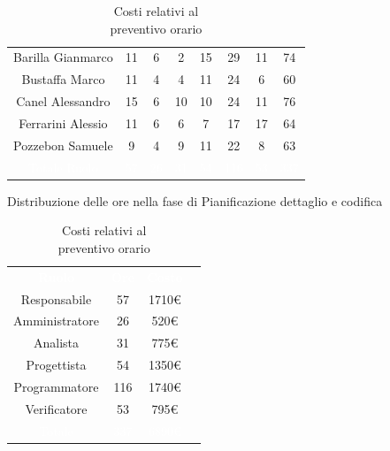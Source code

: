 \begin{table}[h!]
\begin{minipage}[c]{0.53\textwidth}
\begin{tabular}{>{\raggedright\arraybackslash}c|cccccc|c}
		\rowcolor[RGB]{216, 235, 171}
	    	Barilla Gianmarco & 11 & 6 & 2 & 15 & 29 & 11 & 74		\\[9pt]
	    \rowcolor[RGB]{216, 235, 171}
	    	Bustaffa Marco & 11 & 4 & 4 & 11 & 24 & 6 & 60			\\[9pt]
        \rowcolor[RGB]{233, 245, 206}
	    	Canel Alessandro & 15 & 6 & 10 & 10 & 24 & 11 & 76		\\[9pt]
        \rowcolor[RGB]{216, 235, 171}
	    	Ferrarini Alessio & 11 & 6 & 6 & 7 & 17 & 17 & 64 		\\[9pt]
        \rowcolor[RGB]{233, 245, 206}
	    	Pozzebon Samuele & 9 & 4 & 9 & 11 & 22 & 8 & 63			\\[9pt]
		\rowcolor[RGB]{47, 106, 73}
			\textcolor{white}{Totale Ruolo} & \textcolor{white}{57} & \textcolor{white}{26} & \textcolor{white}{31} 
			& \textcolor{white}{54} & \textcolor{white}{116} & \textcolor{white}{53}
			& \textcolor{white}{337} \\[4pt]	
    \end{tabular} 
    \caption{Distribuzione delle ore nella fase di Pianificazione dettaglio e codifica}
\end{minipage}
\hfill
\begin{minipage}{0.33\textwidth}
	\centering
	\begin{tabular}{cccc}
	    \rowcolor[RGB]{33, 73, 50}
	    \textcolor{white}{\textbf{Ruolo}} & \textcolor{white}{\textbf{Ore}} & \textcolor{white}{\textbf{Costo}}\\[4pt]
	    \rowcolor[RGB]{216, 235, 171}
	    Responsabile & 57 & 1710\euro\\[4pt]
	    \rowcolor[RGB]{233, 245, 206}
	    Amministratore & 26 & 520\euro\\[4pt]
        \rowcolor[RGB]{216, 235, 171}
	    Analista & 31 & 775\euro\\[4pt]
	    \rowcolor[RGB]{233, 245, 206}
	    Progettista & 54 & 1350\euro\\[4pt]
        \rowcolor[RGB]{216, 235, 171}
	    Programmatore & 116 & 1740\euro\\[4pt]
	    \rowcolor[RGB]{233, 245, 206}
	    Verificatore & 53 & 795\euro\\[4pt]
		\rowcolor[RGB]{47, 106, 73}
			\textcolor{white}{Totale} & \textcolor{white}{337} & \textcolor{white}{6890\euro}\\[4pt]	
    \end{tabular}	
	\caption{Costi relativi al \\ preventivo orario}

\end{minipage}
\end{table}

